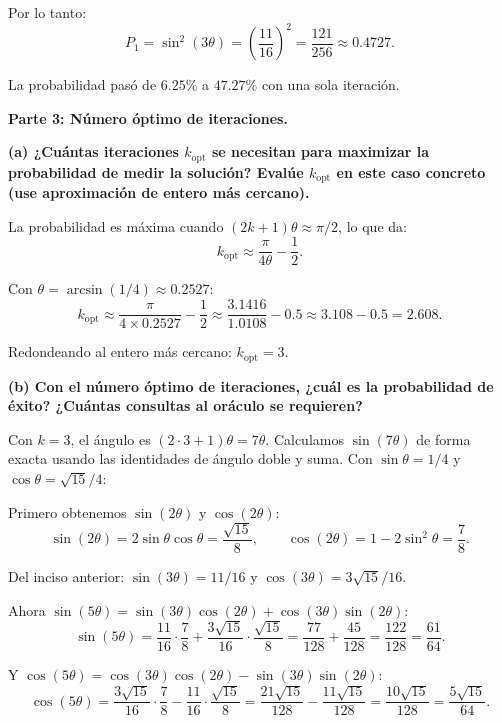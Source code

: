 Por lo tanto:
$$
    \boxed{P_1 = \sin^2(3\theta) = \left(\frac{11}{16}\right)^2 = \frac{121}{256} \approx 0.4727.}
$$

La probabilidad pasó de $6.25\%$ a $47.27\%$ con una sola iteración.

\vspace{0.5cm}

{\bfseries Parte 3: Número óptimo de iteraciones.}

{\bfseries (a) ¿Cuántas iteraciones $k_{\text{opt}}$ se necesitan para maximizar la probabilidad de medir la solución? Evalúe $k_{\text{opt}}$ en este caso concreto (use aproximación de entero más cercano).}

La probabilidad es máxima cuando $(2k+1)\theta \approx \pi/2$, lo que da:
$$
    k_{\text{opt}} \approx \frac{\pi}{4\theta} - \frac{1}{2}.
$$

Con $\theta = \arcsin(1/4) \approx 0.2527$:
$$
    k_{\text{opt}} \approx \frac{\pi}{4 \times 0.2527} - \frac{1}{2} \approx \frac{3.1416}{1.0108} - 0.5 \approx 3.108 - 0.5 = 2.608.
$$

Redondeando al entero más cercano: $\boxed{k_{\text{opt}} = 3.}$

\vspace{0.5cm}

{\bfseries (b) Con el número óptimo de iteraciones, ¿cuál es la probabilidad de éxito? ¿Cuántas consultas al oráculo se requieren?}

Con $k=3$, el ángulo es $(2\cdot 3 + 1)\theta = 7\theta$. Calculamos $\sin(7\theta)$ de forma exacta usando las identidades de ángulo doble y suma. Con $\sin\theta = 1/4$ y $\cos\theta = \sqrt{15}/4$:

Primero obtenemos $\sin(2\theta)$ y $\cos(2\theta)$:
$$
    \sin(2\theta) = 2\sin\theta\cos\theta = \frac{\sqrt{15}}{8}, \qquad \cos(2\theta) = 1 - 2\sin^2\theta = \frac{7}{8}.
$$

Del inciso anterior: $\sin(3\theta) = 11/16$ y $\cos(3\theta) = 3\sqrt{15}/16$.

Ahora $\sin(5\theta) = \sin(3\theta)\cos(2\theta) + \cos(3\theta)\sin(2\theta)$:
$$
    \sin(5\theta) = \frac{11}{16}\cdot\frac{7}{8} + \frac{3\sqrt{15}}{16}\cdot\frac{\sqrt{15}}{8} = \frac{77}{128} + \frac{45}{128} = \frac{122}{128} = \frac{61}{64}.
$$

Y $\cos(5\theta) = \cos(3\theta)\cos(2\theta) - \sin(3\theta)\sin(2\theta)$:
$$
    \cos(5\theta) = \frac{3\sqrt{15}}{16}\cdot\frac{7}{8} - \frac{11}{16}\cdot\frac{\sqrt{15}}{8} = \frac{21\sqrt{15}}{128} - \frac{11\sqrt{15}}{128} = \frac{10\sqrt{15}}{128} = \frac{5\sqrt{15}}{64}.
$$

